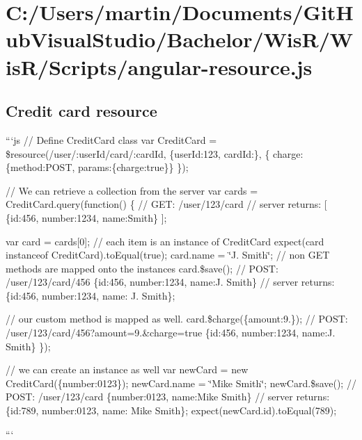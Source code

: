 \hypertarget{_c_1_2_users_2martin_2_documents_2_git_hub_visual_studio_2_bachelor_2_wis_r_2_wis_r_2_scripts_2angular-resource_8js-example}{}\section{C\+:/\+Users/martin/\+Documents/\+Git\+Hub\+Visual\+Studio/\+Bachelor/\+Wis\+R/\+Wis\+R/\+Scripts/angular-\/resource.\+js}
\subsection*{Credit card resource}


\begin{DoxyItemize}
\item ```js // Define Credit\+Card class var Credit\+Card = \$resource(\textquotesingle{}/user/\+:user\+Id/card/\+:card\+Id\textquotesingle{}, \{user\+Id\+:123, card\+Id\+:\textquotesingle{}\textquotesingle{}\}, \{ charge\+: \{method\+:\textquotesingle{}P\+O\+S\+T\textquotesingle{}, params\+:\{charge\+:true\}\} \});

// We can retrieve a collection from the server var cards = Credit\+Card.\+query(function() \{ // G\+E\+T\+: /user/123/card // server returns\+: \mbox{[} \{id\+:456, number\+:\textquotesingle{}1234\textquotesingle{}, name\+:\textquotesingle{}Smith\textquotesingle{}\} \mbox{]};

var card = cards\mbox{[}0\mbox{]}; // each item is an instance of Credit\+Card expect(card instanceof Credit\+Card).to\+Equal(true); card.\+name = \char`\"{}\+J. Smith\char`\"{}; // non G\+E\+T methods are mapped onto the instances card.\$save(); // P\+O\+S\+T\+: /user/123/card/456 \{id\+:456, number\+:\textquotesingle{}1234\textquotesingle{}, name\+:\textquotesingle{}J. Smith\textquotesingle{}\} // server returns\+: \{id\+:456, number\+:\textquotesingle{}1234\textquotesingle{}, name\+: \textquotesingle{}J. Smith\textquotesingle{}\};

// our custom method is mapped as well. card.\$charge(\{amount\+:9.\}); // P\+O\+S\+T\+: /user/123/card/456?amount=9.\&charge=true \{id\+:456, number\+:\textquotesingle{}1234\textquotesingle{}, name\+:\textquotesingle{}J. Smith\textquotesingle{}\} \});

// we can create an instance as well var new\+Card = new Credit\+Card(\{number\+:\textquotesingle{}0123\textquotesingle{}\}); new\+Card.\+name = \char`\"{}\+Mike Smith\char`\"{}; new\+Card.\$save(); // P\+O\+S\+T\+: /user/123/card \{number\+:\textquotesingle{}0123\textquotesingle{}, name\+:\textquotesingle{}Mike Smith\textquotesingle{}\} // server returns\+: \{id\+:789, number\+:\textquotesingle{}0123\textquotesingle{}, name\+: \textquotesingle{}Mike Smith\textquotesingle{}\}; expect(new\+Card.\+id).to\+Equal(789);
\item ```


\end{DoxyItemize}

